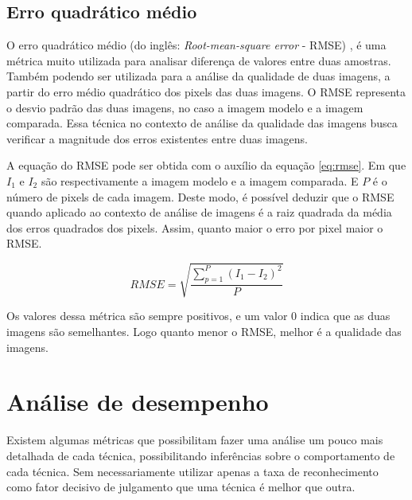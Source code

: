 \subsection{Erro quadrático médio}

O erro quadrático médio (do inglês: \textit{Root-mean-square error} - RMSE) \cite{chai2014root}, é uma métrica muito utilizada para analisar diferença de valores entre duas amostras. Também podendo ser utilizada para a análise da qualidade de duas imagens, a partir do erro médio quadrático dos pixels das duas imagens. O RMSE representa o desvio padrão das duas imagens, no caso a imagem modelo e a imagem comparada. Essa técnica no contexto de análise da qualidade das imagens busca verificar a magnitude dos erros existentes entre duas imagens.

A equação do RMSE pode ser obtida com o auxílio da equação \ref{eq:rmse}. Em que $I_1$ e $I_2$ são respectivamente a imagem modelo e a imagem comparada. E $P$ é o número de pixels de cada imagem. Deste modo, é possível deduzir que o RMSE quando aplicado ao contexto de análise de imagens é a raiz quadrada da média dos erros quadrados dos pixels. Assim, quanto maior o erro por pixel maior o RMSE.

\begin{equation}
RMSE = \sqrt{\frac{\sum_{p=1}^{P} (I_1 - I_2)^2 }{P}}
\label{eq:rmse}
\end{equation}

Os valores dessa métrica são sempre positivos, e um valor 0 indica que as duas imagens são semelhantes. Logo quanto menor o RMSE, melhor é a qualidade das imagens.


\section{Análise de desempenho}

Existem algumas métricas que possibilitam fazer uma análise um pouco mais detalhada de cada técnica, possibilitando inferências sobre o comportamento de cada técnica. Sem necessariamente utilizar apenas a taxa de reconhecimento como fator decisivo de julgamento que uma técnica é melhor que outra.


